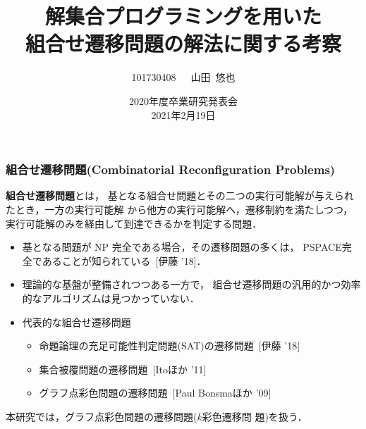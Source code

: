 \documentclass[dvipdfmx,11pt]{beamer}
\title[ASPを用いた組合せ遷移問題の解法に関する考察]{解集合プログラミングを用いた\\組合せ遷移問題の解法に関する考察}
\author{101730408~~~山田~悠也}
\date{2020年度卒業研究発表会\\2021年2月19日}
\institute{番原研究室}
\begin{document}
\begin{frame}\frametitle{}
  \titlepage
\end{frame}

\begin{frame}\frametitle{組合せ遷移問題(Combinatorial Reconfiguration Problems)}

  \begin{alertblock}{}
    \alert{\bf 組合せ遷移問題}とは，
    基となる組合せ問題とその二つの実行可能解が与えられたとき，一方の実行可能解
    から他方の実行可能解へ，遷移制約を満たしつつ，
    実行可能解のみを経由して到達できるかを判定する問題．
  \end{alertblock}

  \begin{itemize}
    \item 基となる問題が NP 完全である場合，その遷移問題の多くは，
      \alert{PSPACE完全}であることが知られている~[伊藤 '18]．
    \item 理論的な基盤が整備されつつある一方で，
      組合せ遷移問題の\alert{汎用的かつ効率的なアルゴリズムは見つかっていない}．
    \item 代表的な組合せ遷移問題
      \begin{itemize}
      \item 命題論理の充足可能性判定問題(SAT)の遷移問題~[伊藤 '18]
      \item 集合被覆問題の遷移問題~[Itoほか '11]
      \item グラフ点彩色問題の遷移問題~[Paul Bonsmaほか '09]
      \end{itemize}
  \end{itemize}
  \begin{alertblock}{}\centering
    本研究では，グラフ点彩色問題の遷移問題(\alert{$k$彩色遷移問
      題})を扱う．
  \end{alertblock}

  
\end{frame}
\end{document}
